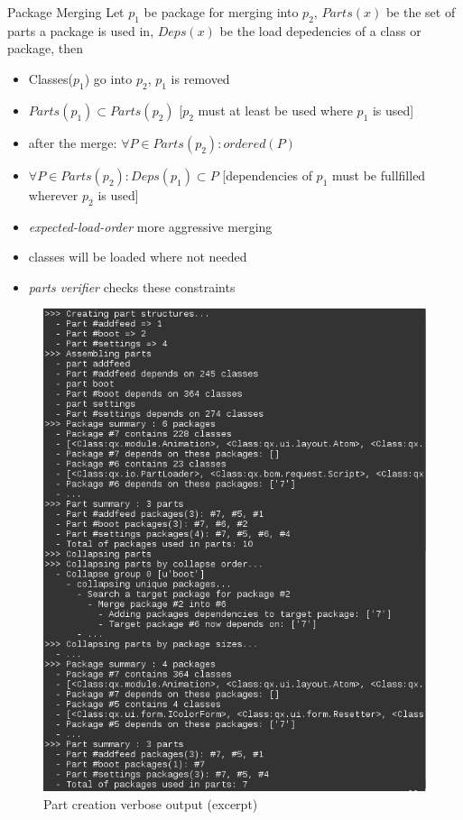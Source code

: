 \documentclass[final]{beamer}
\newlength{\onecolwid}
\begin{document}
\begin{frame}[t]
\begin{columns}[t]
\begin{column}{\onecolwid}
      \begin{block}{Package Merging}
        Let $p_1$ be package for merging into $p_2$, $Parts(x)$ be
        the set of parts a package is used in, $Deps(x)$ be the load depedencies of
        a class or package, then
        \begin{itemize}
          \item Classes($p_1$) go into $p_2$, $p_1$ is removed
          \item $Parts(p_1) \subset Parts(p_2)$  [$p_2$ must at least be used where $p_1$ is
            used]
          \item after the merge: $\forall P \in Parts(p_2): ordered(P)$
          \item $\forall P \in Parts(p_2): Deps(p_1) \subset P$
            [dependencies of $p_1$ must be fullfilled wherever $p_2$ is used]
          \item \textit{expected-load-order} more aggressive merging
          \item classes will be loaded where not needed
          \item \textit{parts verifier} checks these constraints
        \end{itemize}
        \begin{figure}
          \begin{center}
            \includegraphics[width=\onecolwid]{g_parts_log.png}
            \caption{Part creation verbose output (excerpt)}
            \label{fig:corrSubsys}
          \end{center}
        \end{figure}
      \end{block}


\end{column}
\end{columns}
\end{frame}
\end{document}
